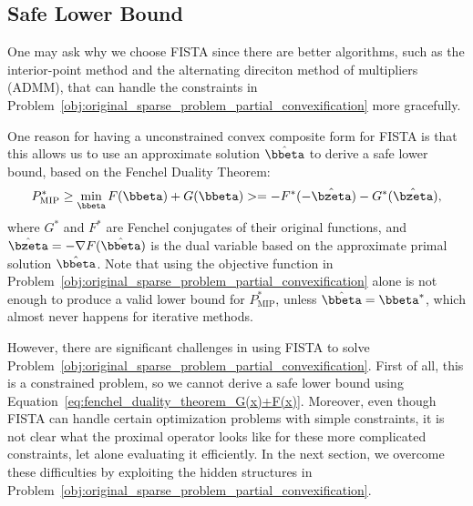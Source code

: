 \subsection{Safe Lower Bound}
One may ask why we choose FISTA since there are better algorithms, such as the interior-point method and the alternating direciton method of multipliers (ADMM), that can handle the constraints in Problem~\eqref{obj:original_sparse_problem_partial_convexification} more gracefully.

One reason for having a unconstrained convex composite form for FISTA is that this allows us to use an approximate solution $\hat{\bbeta}$ to derive a safe lower bound, based on the Fenchel Duality Theorem:
\begin{align}
    \label{eq:fenchel_duality_theorem_G(x)+F(x)}
    P_{\text{MIP}}^* \geq \min_{\bbeta }F(\bbeta) + G(\bbeta) >= -F^*(-\hat{\bzeta})-G^*(\hat{\bzeta}),
\end{align}
where $G^*$ and $F^*$ are Fenchel conjugates of their original functions, and $\hat{\bzeta} = -\nabla F(\hat{\bbeta})$ is the dual variable based on the approximate primal solution $\hat{\bbeta}$.
Note that using the objective function in Problem~\eqref{obj:original_sparse_problem_partial_convexification} alone is not enough to produce a valid lower bound for $P_{\text{MIP}}^*$, unless $\hat{\bbeta}=\bbeta^*$, which almost never happens for iterative methods.

However, there are significant challenges in using FISTA to solve Problem~\eqref{obj:original_sparse_problem_partial_convexification}.
First of all, this is a constrained problem, so we cannot derive a safe lower bound using Equation~\eqref{eq:fenchel_duality_theorem_G(x)+F(x)}.
Moreover, even though FISTA can handle certain optimization problems with simple constraints, it is not clear what the proximal operator looks like for these more complicated constraints, let alone evaluating it efficiently.
In the next section, we overcome these difficulties by exploiting the hidden structures in Problem~\eqref{obj:original_sparse_problem_partial_convexification}.



